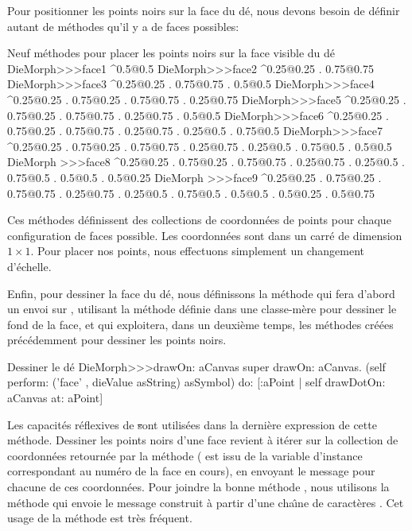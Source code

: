 \documentclass[a4paper,10pt,twoside]{book}
\begin{document}
Pour positionner les points noirs sur la face du d\'e, nous devons
besoin de d\'efinir autant de m\'ethodes qu'il y a de faces possibles:

\begin{methods}{Neuf m\'ethodes pour placer les points noirs sur la face visible du d\'e}
DieMorph>>>face1
	^{0.5@0.5}
DieMorph>>>face2
	^{0.25@0.25 . 0.75@0.75}
DieMorph>>>face3
	^{0.25@0.25 . 0.75@0.75 . 0.5@0.5}
DieMorph>>>face4
	^{0.25@0.25 . 0.75@0.25 . 0.75@0.75 . 0.25@0.75}
DieMorph>>>face5
	^{0.25@0.25 . 0.75@0.25 . 0.75@0.75 . 0.25@0.75 . 0.5@0.5}
DieMorph>>>face6
	^{0.25@0.25 . 0.75@0.25 . 0.75@0.75 . 0.25@0.75 . 0.25@0.5 . 0.75@0.5}
DieMorph>>>face7
	^{0.25@0.25 . 0.75@0.25 . 0.75@0.75 . 0.25@0.75 . 0.25@0.5 . 0.75@0.5 . 0.5@0.5}
DieMorph >>>face8
	^{0.25@0.25 . 0.75@0.25 . 0.75@0.75 . 0.25@0.75 . 0.25@0.5 . 0.75@0.5 . 0.5@0.5 . 0.5@0.25}
DieMorph >>>face9
	^{0.25@0.25 . 0.75@0.25 . 0.75@0.75 . 0.25@0.75 . 0.25@0.5 . 0.75@0.5 . 0.5@0.5 . 0.5@0.25 . 0.5@0.75}
\end{methods}

Ces m\'ethodes d\'efinissent des collections de coordonn\'ees de
points pour chaque configuration de faces possible. Les coordonn\'ees
sont dans un carr\'e de dimension $1\times1$. Pour placer nos points,
nous effectuons simplement un changement d'\'echelle.

Enfin, pour dessiner la face du d\'e, nous d\'efinissons la m\'ethode
 qui fera d'abord un envoi sur , utilisant la m\'ethode
d\'efinie dans une classe-m\`ere pour dessiner le fond de la face, et
qui exploitera, dans un deuxi\`eme temps, les m\'ethodes cr\'e\'ees
pr\'ec\'edemment pour dessiner les points noirs.

\begin{method}{Dessiner le d\'e}
DieMorph>>>drawOn: aCanvas
	super drawOn: aCanvas.
	(self perform: ('face' , dieValue asString) asSymbol)
		do: [:aPoint | self drawDotOn: aCanvas at: aPoint]
\end{method}

Les capacit\'es r\'eflexives de \st sont utilis\'ees dans la
derni\`ere expression de cette m\'ethode. Dessiner les points noirs
d'une face revient \`a it\'erer sur la collection 
de coordonn\'ees retourn\'ee par la m\'ethode  
( est issu de la variable d'instance 
correspondant au num\'ero de la face en cours),
en envoyant le message  pour chacune de ces
coordonn\'ees. Pour joindre la bonne m\'ethode %
, nous utilisons la m\'ethode  qui
envoie le message construit \`a partir d'une cha\^{\i}ne de
caract\`eres .
Cet usage de la m\'ethode  est tr\`es fr\'equent.
\end{document}
